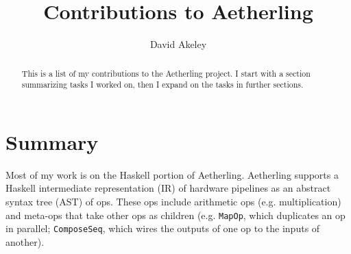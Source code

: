 \documentclass[12pt]{article}
\begin{document}
\sloppy
\title{Contributions to Aetherling}
\author{David Akeley}
\maketitle

\begin{abstract}
This is a list of my contributions to the Aetherling project. I start
with a section summarizing tasks I worked on, then I expand on the
tasks in further sections.
\end{abstract}

\section{Summary}

Most of my work is on the Haskell portion of Aetherling.
Aetherling supports a Haskell intermediate representation (IR) of
hardware pipelines as an abstract syntax tree (AST) of ops.  These ops
include arithmetic ops (e.g. multiplication) and meta-ops that take
other ops as children (e.g. \texttt{MapOp}, which duplicates an op in
parallel; \texttt{ComposeSeq}, which wires the outputs of one op to
the inputs of another).
\end{document}
